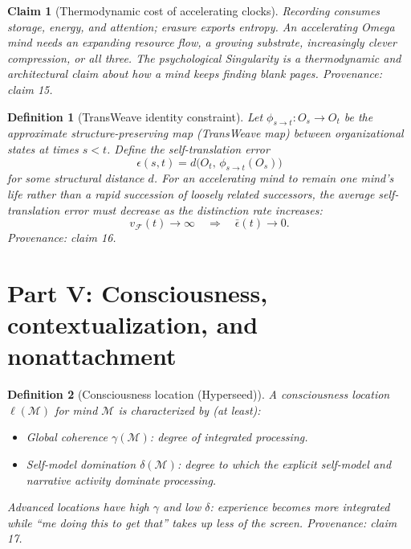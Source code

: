 \documentclass[11pt]{article}
\newtheorem{definition}{Definition}
\newtheorem{claim}{Claim}
\begin{document}
\begin{claim}[Thermodynamic cost of accelerating clocks]
\label{claim:thermo}
Recording consumes storage, energy, and attention; erasure exports entropy. An accelerating Omega mind needs an expanding resource flow, a growing substrate, increasingly clever compression, or all three. The psychological Singularity is a thermodynamic and architectural claim about how a mind keeps finding blank pages.
\emph{Provenance: claim 15.}
\end{claim}

\begin{definition}[TransWeave identity constraint]
\label{def:transweave}
Let $\phi_{s \to t}\colon O_s \to O_t$ be the approximate structure-preserving map (TransWeave map) between organizational states at times $s < t$. Define the \emph{self-translation error}
\[
  \epsilon(s,t) = d\bigl(O_t,\, \phi_{s\to t}(O_s)\bigr)
\]
for some structural distance $d$. For an accelerating mind to remain \emph{one mind's life} rather than a rapid succession of loosely related successors, the average self-translation error must decrease as the distinction rate increases:
\[
  v_{\mathcal{F}}(t) \to \infty \quad\Longrightarrow\quad \bar{\epsilon}(t) \to 0.
\]
\emph{Provenance: claim 16.}
\end{definition}

\section{Part V: Consciousness, contextualization, and nonattachment}

\begin{definition}[Consciousness location (Hyperseed)]
\label{def:consloc}
A \emph{consciousness location} $\ell(\mathcal{M})$ for mind $\mathcal{M}$ is characterized by (at least):
\begin{itemize}
  \item \emph{Global coherence} $\gamma(\mathcal{M})$: degree of integrated processing.
  \item \emph{Self-model domination} $\delta(\mathcal{M})$: degree to which the explicit self-model and narrative activity dominate processing.
\end{itemize}
Advanced locations have high $\gamma$ and low $\delta$: experience becomes more integrated while ``me doing this to get that'' takes up less of the screen.
\emph{Provenance: claim 17.}
\end{definition}
\end{document}
